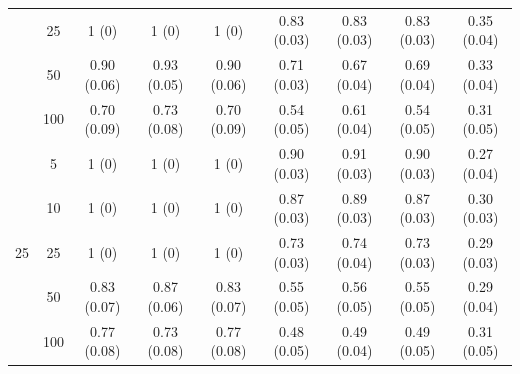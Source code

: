 \documentclass[11pt]{article}
\theoremstyle{definition}
\begin{document}
\begin{table}[H]
\begin{center}
\begin{tabular}{cc|ccc|cccc}
   & 25  & 1 (0) & 1 (0) & 1 (0) & 0.83 (0.03) & 0.83 (0.03) & 0.83 (0.03) & 0.35 (0.04) \\ 
  & 50  & 0.90 (0.06) & 0.93 (0.05) & 0.90 (0.06) & 0.71 (0.03) & 0.67 (0.04) & 0.69 (0.04) & 0.33 (0.04) \\ 
    & 100  & 0.70 (0.09) & 0.73 (0.08) & 0.70 (0.09) & 0.54 (0.05) & 0.61 (0.04) & 0.54 (0.05) & 0.31 (0.05) \\[.3cm] 
   \multirow{5}{*}{25} & 5  & 1 (0) & 1 (0) & 1 (0) & 0.90 (0.03) & 0.91 (0.03) & 0.90 (0.03) & 0.27 (0.04) \\ 
    & 10  & 1 (0) & 1 (0) & 1 (0) & 0.87 (0.03) & 0.89 (0.03) & 0.87 (0.03) & 0.30 (0.03) \\ 
    & 25  & 1 (0) & 1 (0) & 1 (0) & 0.73 (0.03) & 0.74 (0.04) & 0.73 (0.03) & 0.29 (0.03) \\ 
    & 50  & 0.83 (0.07) & 0.87 (0.06) & 0.83 (0.07) & 0.55 (0.05) & 0.56 (0.05) & 0.55 (0.05) & 0.29 (0.04) \\ 
    & 100  & 0.77 (0.08) & 0.73 (0.08) & 0.77 (0.08) & 0.48 (0.05) & 0.49 (0.04) & 0.49 (0.05) & 0.31 (0.05) \\ 
\end{tabular}
   \end{center}
      \vspace{-.5cm}
\end{table}
\end{document}
